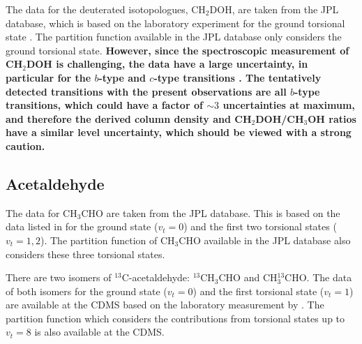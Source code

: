 \documentclass[linenumbers, twocolumn, twocolappendix, astrosymb, times]{aastex631}
\newcommand{\methanol}{CH$_3$OH\xspace}
\newcommand{\acetaldehyde}{CH$_3$CHO\xspace}
\begin{document}
The data for the deuterated isotopologues, CH$_2$DOH, are taken from the JPL database, which is based on the laboratory experiment for the ground torsional state \citep{Pearson2012}. The partition function available in the JPL database only considers the ground torsional state. \textbf{However, since the spectroscopic measurement of CH$_2$DOH is challenging, the data have a large uncertainty, in particular for the $b$-type and $c$-type transitions \citep[][Oyama et al. in press]{Pearson2012}. The tentatively detected transitions with the present observations are all $b$-type transitions, which could have a factor of $\sim3$ uncertainties at maximum, and therefore the derived column density and CH$_2$DOH/CH$_3$OH ratios have a similar level uncertainty, which should be viewed with a strong caution.}


\subsection{Acetaldehyde}
The data for \acetaldehyde are taken from the JPL database. This is based on the data listed in \citep{Kleiner1996} for the ground state ($v_t = 0$) and the first two torsional states ($v_t = 1, 2$). The partition function of \acetaldehyde available in the JPL database also considers these three torsional states. 

There are two isomers of $^{13}$C-acetaldehyde: $^{13}$CH$_3$CHO and CH$_3^{13}$CHO. The data of both isomers for the ground state ($v_t = 0$) and the first torsional state ($v_t = 1$) are available at the CDMS based on the laboratory measurement by \citep{Margules2015}. The partition function which considers the contributions from torsional states up to $v_t = 8$ is also available at the CDMS.
\end{document}
